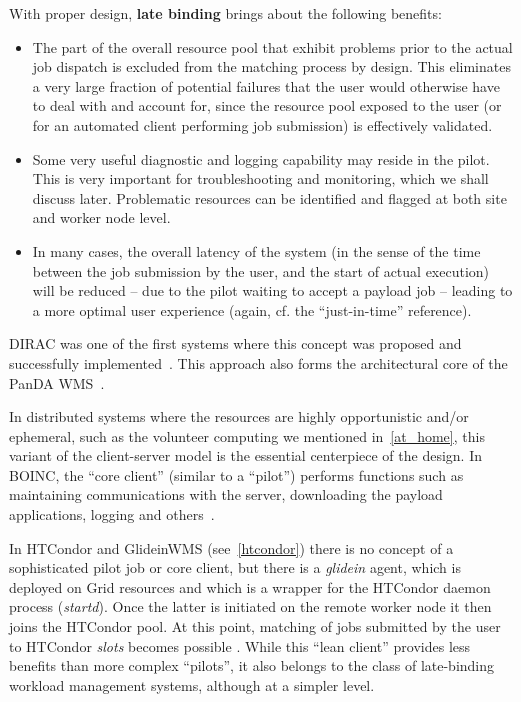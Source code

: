 With proper design,\textbf{ late binding} brings about the following benefits:
\begin{itemize}
\item The part of the overall resource pool that exhibit problems prior to the actual job dispatch is excluded from the matching process by design.
This eliminates a very large fraction of potential failures that the user would otherwise have to deal with and account for, since the resource pool
exposed to the user (or for an automated client performing job submission) is effectively validated.

\item Some very useful diagnostic and logging capability may reside in the pilot. This is very important for troubleshooting and monitoring, which we shall discuss later.
Problematic resources can be identified and flagged at both site and worker node level.

\item In many cases, the overall latency of the system (in the sense of the time between the job submission by the user, and the start of actual execution) will be reduced --
due to the pilot waiting to accept a payload job -- leading to a more optimal user experience (again, cf. the ``just-in-time'' reference).
\end{itemize}

DIRAC was one of the first systems where this concept was proposed and successfully implemented~\cite{dirac_acat09}. This approach also forms the architectural core
of the PanDA WMS~\cite{panda_chep12}.

In distributed systems where the resources are highly opportunistic and/or ephemeral, such as the volunteer computing we mentioned in~\ref{at_home}, this variant
of the client-server model is the essential centerpiece of the design. In BOINC, the ``core client'' (similar to a ``pilot'') performs functions such as maintaining
communications with the server, downloading the payload applications, logging and others~\cite{boinc_client}.

In HTCondor and GlideinWMS (see~\ref{htcondor}) there is no concept of a sophisticated pilot job or core client, but there is a \textit{glidein} agent, which is deployed on Grid resources
and which is a wrapper for the HTCondor daemon process (\textit{startd}). Once the latter is initiated
on the remote worker node it then joins the HTCondor pool. At this point, matching of jobs submitted by the user to HTCondor \textit{slots} becomes possible \cite{glideinwms}.
While this ``lean client'' provides less benefits than more complex ``pilots'', it also belongs to the class of late-binding workload management systems, although at a simpler level.


